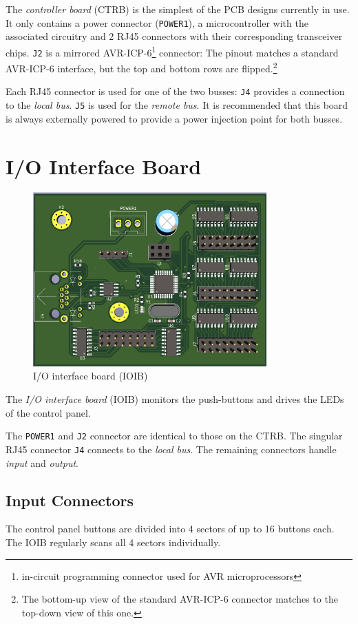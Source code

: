 \documentclass{scrreprt}
\begin{document}
The \emph{controller board} (CTRB) is the simplest of the PCB designs currently in use.
It only contains a power connector (\texttt{POWER1}), a microcontroller with the associated circuitry and 2 RJ45 connectors with their corresponding transceiver chips.
\texttt{J2} is a mirrored AVR-ICP-6\footnote{in-circuit programming connector used for AVR microprocessors} connector:
The pinout matches a standard AVR-ICP-6 interface, but the top and bottom rows are flipped.\footnote{The bottom-up view of the standard AVR-ICP-6 connector matches to the top-down view of this one.}

Each RJ45 connector is used for one of the two busses:
\texttt{J4} provides a connection to the \emph{local bus}.
\texttt{J5} is used for the \emph{remote bus}.
It is recommended that this board is always externally powered to provide a power injection point for both busses.

\section{I/O Interface Board}
\begin{figure}[h!]
    \centering
    \includegraphics[width=0.8\textwidth]{interface}
    \caption{I/O interface board (IOIB)}
\end{figure}

The \emph{I/O interface board} (IOIB) monitors the push-buttons and drives the LEDs of the control panel.

The \texttt{POWER1} and \texttt{J2} connector are identical to those on the CTRB.
The singular RJ45 connector \texttt{J4} connects to the \emph{local bus}.
The remaining connectors handle \emph{input} and \emph{output}.

\subsection{Input Connectors}
The control panel buttons are divided into 4 sectors of up to 16 buttons each.
The IOIB regularly scans all 4 sectors individually.
\end{document}
